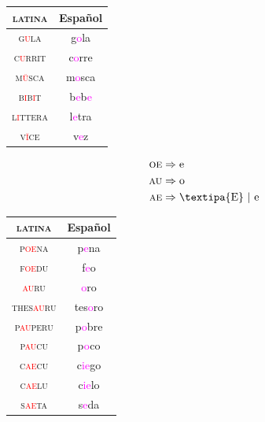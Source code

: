 \documentclass{report}[12pt]
\begin{document}
\begin{tabular}{c c}
  \textsc{latina} & Español \\
  \hline
  \textsc{g\textcolor{red}{u}la} & g\textcolor{magenta}{o}la \\
  \textsc{c\textcolor{red}{u}rrit} & c\textcolor{magenta}{o}rre \\
  \textsc{m\textcolor{red}{\u{u}}sca} & m\textcolor{magenta}{o}sca \\
  \textsc{b\textcolor{red}{i}b\textcolor{red}{i}t} & b\textcolor{magenta}{e}b\textcolor{magenta}{e} \\
  \textsc{l\textcolor{red}{i}ttera} & l\textcolor{magenta}{e}tra \\
  \textsc{v\textcolor{red}{\u{i}}ce} & v\textcolor{magenta}{e}z \\
\end{tabular}

\begin{tcolorbox}[title=Monophthongization]
  \begin{align*}
    \textsc{oe} & \Rightarrow \text{e} \\
    \textsc{au} & \Rightarrow \text{o} \\
    \textsc{ae} & \Rightarrow \text{\textipa{E}}\ |\ \text{e} \\
  \end{align*}
\end{tcolorbox}

\begin{tabular}{c c}
  \textsc{latina} & Español \\
  \hline
  \textsc{p\textcolor{red}{oe}na} & p\textcolor{magenta}{e}na \\
  \textsc{f\textcolor{red}{oe}du} & f\textcolor{magenta}{e}o \\
  \textsc{\textcolor{red}{au}ru} & \textcolor{magenta}{o}ro \\
  \textsc{thes\textcolor{red}{au}ru} & tes\textcolor{magenta}{o}ro \\
  \textsc{p\textcolor{red}{au}peru} & p\textcolor{magenta}{o}bre \\
  \textsc{p\textcolor{red}{au}cu} & p\textcolor{magenta}{o}co \\
  \textsc{c\textcolor{red}{ae}cu} & c\textcolor{magenta}{ie}go \\
  \textsc{c\textcolor{red}{ae}lu} & c\textcolor{magenta}{ie}lo \\
  \textsc{s\textcolor{red}{ae}ta} & s\textcolor{magenta}{e}da \\
\end{tabular}
\end{document}
